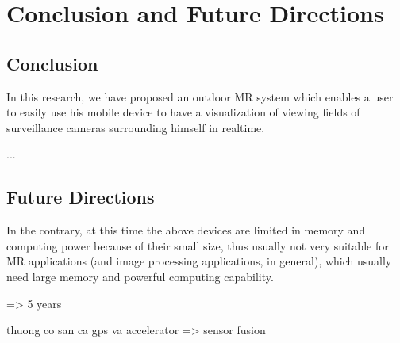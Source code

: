 \chapter{Conclusion and Future Directions}
\label{Chapter6}

\section{Conclusion}

In this research, we have proposed an outdoor MR system which enables a user to easily use his mobile device to have a visualization of viewing fields of surveillance cameras surrounding himself in realtime.

...

\section{Future Directions}

In the contrary, at this time the above devices are limited in memory and computing power because of their small size, thus usually not very suitable for MR applications (and image processing applications, in general), which usually need large memory and powerful computing capability.

=> 5 years

thuong co san ca gps va accelerator => sensor fusion

